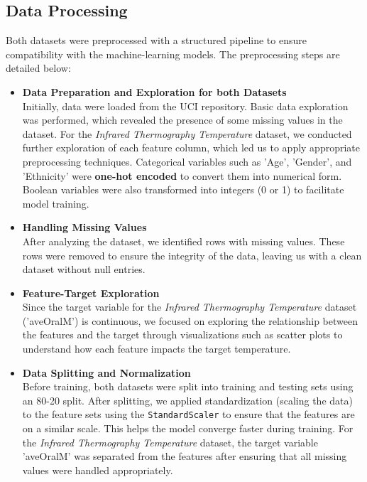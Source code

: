 \documentclass{article}
\begin{document}
\subsection{Data Processing}
Both datasets were preprocessed with a structured pipeline to ensure compatibility with the machine-learning models. The preprocessing steps are detailed below:
\begin{itemize}
    
    \item \textbf{Data Preparation and Exploration for both Datasets} \\
    Initially, data were loaded from the UCI repository. Basic data exploration was performed, which revealed the presence of some missing values in the dataset. For the \textit{Infrared Thermography Temperature} dataset, we conducted further exploration of each feature column, which led us to apply appropriate preprocessing techniques. Categorical variables such as 'Age', 'Gender', and 'Ethnicity' were \textbf{one-hot encoded} to convert them into numerical form. Boolean variables were also transformed into integers (0 or 1) to facilitate model training.
    \item \textbf{Handling Missing Values} \\
    After analyzing the dataset, we identified rows with missing values. These rows were removed to ensure the integrity of the data, leaving us with a clean dataset without null entries.
    \item \textbf{Feature-Target Exploration}  \\
    Since the target variable for the \textit{Infrared Thermography Temperature} dataset ('aveOralM') is continuous, we focused on exploring the relationship between the features and the target through visualizations such as scatter plots to understand how each feature impacts the target temperature.
    \item \textbf{Data Splitting and Normalization} \\
    Before training, both datasets were split into training and testing sets using an 80-20 split. After splitting, we applied standardization (scaling the data) to the feature sets using the \texttt{StandardScaler} to ensure that the features are on a similar scale. This helps the model converge faster during training. For the \textit{Infrared Thermography Temperature} dataset, the target variable 'aveOralM' was separated from the features after ensuring that all missing values were handled appropriately.
\end{itemize}
\end{document}
